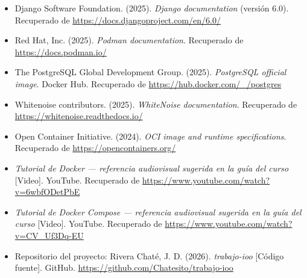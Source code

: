 \documentclass[12pt,a4paper]{article}
\begin{document}
\begin{itemize}[leftmargin=*, labelsep=0.5em]
    \item Django Software Foundation. (2025). \textit{Django documentation} (versión 6.0). Recuperado de \url{https://docs.djangoproject.com/en/6.0/}
    \item Red Hat, Inc. (2025). \textit{Podman documentation}. Recuperado de \url{https://docs.podman.io/}
    \item The PostgreSQL Global Development Group. (2025). \textit{PostgreSQL official image}. Docker Hub. Recuperado de \url{https://hub.docker.com/_/postgres}
    \item Whitenoise contributors. (2025). \textit{WhiteNoise documentation}. Recuperado de \url{https://whitenoise.readthedocs.io/}
    \item Open Container Initiative. (2024). \textit{OCI image and runtime specifications}. Recuperado de \url{https://opencontainers.org/}
    \item \textit{Tutorial de Docker — referencia audiovisual sugerida en la guía del curso} [Video]. YouTube. Recuperado de \url{https://www.youtube.com/watch?v=6wbfODetPbE}
    \item \textit{Tutorial de Docker Compose — referencia audiovisual sugerida en la guía del curso} [Video]. YouTube. Recuperado de \url{https://www.youtube.com/watch?v=CV_Uf3Dq-EU}
    \item Repositorio del proyecto: Rivera Chaté, J. D. (2026). \textit{trabajo-ioo} [Código fuente]. GitHub. \url{https://github.com/Chatesito/trabajo-ioo}
\end{itemize}
\end{document}
